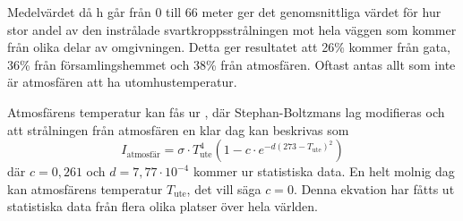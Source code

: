 Medelvärdet då h går från 0 till 66 meter ger det genomsnittliga värdet för hur stor andel 
av den instrålade svartkroppsstrålningen mot hela väggen som kommer från olika delar
 av omgivningen. Detta ger resultatet att 26\% kommer från gata, 36\% från 
 församlingshemmet och 38\% från atmosfären. Oftast antas allt som inte är atmosfären att ha utomhustemperatur.
 
Atmosfärens temperatur kan fås ur \cite{bb_atmosphere}, där Stephan-Boltzmans lag modifieras och att strålningen från atmosfären en klar dag kan beskrivas som 
\begin{equation}
I_\text{atmosfär}=\sigma\cdot T_\text{ute}^4(1-c \cdot e^{-d(273-T_\text{ute})^2})
\end{equation}
där $c=0,261$ och $d=7,77\cdot10^{-4}$ kommer ur statistiska data. En helt molnig dag kan atmosfärens temperatur $T_\text{ute}$, det vill säga $c=0$. Denna ekvation har fåtts ut statistiska data från flera olika platser över hela världen. 